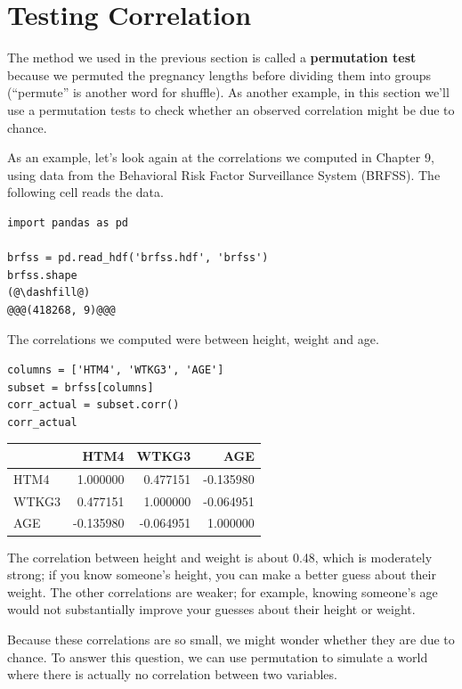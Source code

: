 \hypertarget{testing-correlation}{%
\section{Testing Correlation}\label{testing-correlation}}

The method we used in the previous section is called a
\textbf{permutation test} because we permuted the pregnancy lengths
before dividing them into groups (``permute'' is another word for
shuffle). As another example, in this section we'll use a permutation
tests to check whether an observed correlation might be due to chance.

As an example, let's look again at the correlations we computed in
Chapter 9, using data from the Behavioral Risk Factor Surveillance
System (BRFSS). The following cell reads the data.

\begin{lstlisting}[]
import pandas as pd

brfss = pd.read_hdf('brfss.hdf', 'brfss')
brfss.shape
(@\dashfill@)
@@@(418268, 9)@@@
\end{lstlisting}

The correlations we computed were between height, weight and age.

\begin{lstlisting}[]
columns = ['HTM4', 'WTKG3', 'AGE']
subset = brfss[columns]
corr_actual = subset.corr()
corr_actual
\end{lstlisting}

\begin{tabular}{lrrr}
\midrule
{} &      HTM4 &     WTKG3 &       AGE \\
\midrule
HTM4  &  1.000000 &  0.477151 & -0.135980 \\
WTKG3 &  0.477151 &  1.000000 & -0.064951 \\
AGE   & -0.135980 & -0.064951 &  1.000000 \\
\midrule
\end{tabular}

The correlation between height and weight is about 0.48, which is
moderately strong; if you know someone's height, you can make a better
guess about their weight. The other correlations are weaker; for
example, knowing someone's age would not substantially improve your
guesses about their height or weight.

Because these correlations are so small, we might wonder whether they
are due to chance. To answer this question, we can use permutation to
simulate a world where there is actually no correlation between two
variables.

